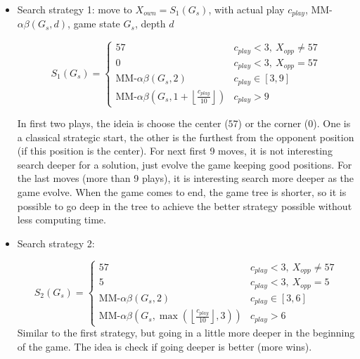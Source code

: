 \documentclass[a4paper]{article}
\begin{document}
\begin{itemize}
    \item Search strategy 1: move to $X_{own} = S_1(G_s)$, with actual play $c_{play}$, MM-$\alpha\beta (G_s,d)$, game state $G_s$, depth $d$
    
    \begin{equation}
        S_1(G_s) = \left \{
        \begin{matrix} 
        57 &  c_{play} < 3,~ X_{opp} \neq 57 \\
        0 &  c_{play} < 3,~ X_{opp} = 57 \\
        \text{MM-$\alpha\beta$}(G_s,2) & c_{play} \in [3, 9] \\
        \text{MM-$\alpha\beta$} \left ( G_s, 1+\left \lfloor \frac{c_{play}}{10} \right \rfloor \right ) & c_{play} > 9
        \end{matrix} \right .
        \label{S1}
    \end{equation}
    
    In first two plays, the ideia is choose the center ($57$) or the corner ($0$). One is a classical strategic start, the other is the furthest from the opponent position (if this position is the center). For next first 9 moves, it is not interesting search deeper for a solution, just evolve the game keeping good positions. For the last moves (more than 9 plays), it is interesting search more deeper as the game evolve. When the game comes to end, the game tree is shorter, so it is possible to go deep in the tree to achieve the better strategy possible without less computing time.
    
        \item Search strategy 2:
    
    \begin{equation}
        S_2(G_s) = \left \{
        \begin{matrix} 
        57 &  c_{play} < 3,~ X_{opp} \neq 57 \\
        5 &  c_{play} < 3,~ X_{opp} = 5 \\
        \text{MM-$\alpha\beta$}(G_s,2) & c_{play} \in [3, 6] \\
        \text{MM-$\alpha\beta$} \left ( G_s, \max \left ( \left \lfloor \frac{c_{play}}{10} \right \rfloor, 3 \right ) \right ) & c_{play} > 6
        \end{matrix} \right .
        \label{S2}
        \end{equation}
Similar to the first strategy, but going in a little more deeper in the beginning of the game. The idea is check if going deeper is better (more wins).
    

\end{itemize}
\end{document}
